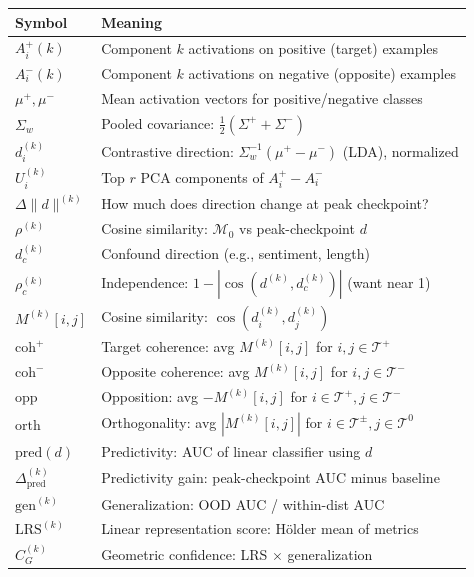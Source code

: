 \documentclass[11pt]{article}
\begin{document}
\begin{center}
\begin{tabular}{ll}
\toprule
\textbf{Symbol} & \textbf{Meaning} \\
\midrule
$A^+_i(k)$ & Component $k$ activations on positive (target) examples \\
$A^-_i(k)$ & Component $k$ activations on negative (opposite) examples \\
$\mu^+, \mu^-$ & Mean activation vectors for positive/negative classes \\
$\Sigma_w$ & Pooled covariance: $\frac{1}{2}(\Sigma^+ + \Sigma^-)$ \\
$d^{(k)}_i$ & Contrastive direction: $\Sigma_w^{-1}(\mu^+ - \mu^-)$ (LDA), normalized \\
$U^{(k)}_i$ & Top $r$ PCA components of $A^+_i - A^-_i$ \\
$\Delta \|d\|^{(k)}$ & How much does direction change at peak checkpoint? \\
$\rho^{(k)}$ & Cosine similarity: $\mathcal{M}_0$ vs peak-checkpoint $d$ \\
$d^{(k)}_c$ & Confound direction (e.g., sentiment, length) \\
$\rho^{(k)}_c$ & Independence: $1 - |\cos(d^{(k)}, d^{(k)}_c)|$ (want near 1) \\
\midrule
$M^{(k)}[i,j]$ & Cosine similarity: $\cos(d^{(k)}_i, d^{(k)}_j)$ \\
$\text{coh}^+$ & Target coherence: avg $M^{(k)}[i,j]$ for $i,j \in \mathcal{T}^+$ \\
$\text{coh}^-$ & Opposite coherence: avg $M^{(k)}[i,j]$ for $i,j \in \mathcal{T}^-$ \\
$\text{opp}$ & Opposition: avg $-M^{(k)}[i,j]$ for $i \in \mathcal{T}^+, j \in \mathcal{T}^-$ \\
$\text{orth}$ & Orthogonality: avg $|M^{(k)}[i,j]|$ for $i \in \mathcal{T}^{\pm}, j \in \mathcal{T}^0$ \\
$\text{pred}(d)$ & Predictivity: AUC of linear classifier using $d$ \\
$\Delta^{(k)}_{\text{pred}}$ & Predictivity gain: peak-checkpoint AUC minus baseline \\
$\text{gen}^{(k)}$ & Generalization: OOD AUC / within-dist AUC \\
$\text{LRS}^{(k)}$ & Linear representation score: Hölder mean of metrics \\
$C^{(k)}_G$ & Geometric confidence: LRS $\times$ generalization \\
\bottomrule
\end{tabular}
\end{center}
\end{document}

